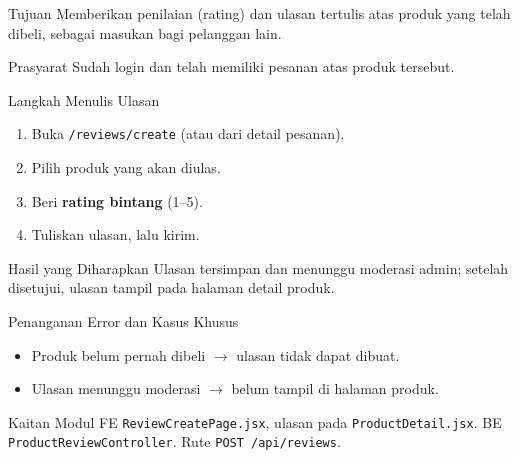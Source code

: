 
\begin{flowsection}{Tujuan}
Memberikan penilaian (rating) dan ulasan tertulis atas produk yang telah dibeli,
sebagai masukan bagi pelanggan lain.
\end{flowsection}

\begin{flowsection}{Prasyarat}
Sudah login dan telah memiliki pesanan atas produk tersebut.
\end{flowsection}

\begin{flowsection}{Langkah Menulis Ulasan}
\begin{enumerate}
  \item Buka \texttt{/reviews/create} (atau dari detail pesanan).
  \item Pilih produk yang akan diulas.
  \item Beri \textbf{rating bintang} (1--5).
  \item Tuliskan ulasan, lalu kirim.
\end{enumerate}
\end{flowsection}


\begin{flowsection}{Hasil yang Diharapkan}
Ulasan tersimpan dan menunggu moderasi admin; setelah disetujui, ulasan tampil
pada halaman detail produk.
\end{flowsection}

\begin{flowsection}{Penanganan Error dan Kasus Khusus}
\begin{itemize}
  \item Produk belum pernah dibeli $\rightarrow$ ulasan tidak dapat dibuat.
  \item Ulasan menunggu moderasi $\rightarrow$ belum tampil di halaman produk.
\end{itemize}
\end{flowsection}

\begin{flowsection}{Kaitan Modul}
FE \texttt{ReviewCreatePage.jsx}, ulasan pada \texttt{ProductDetail.jsx}. BE
\texttt{ProductReviewController}. Rute \texttt{POST /api/reviews}.
\end{flowsection}

